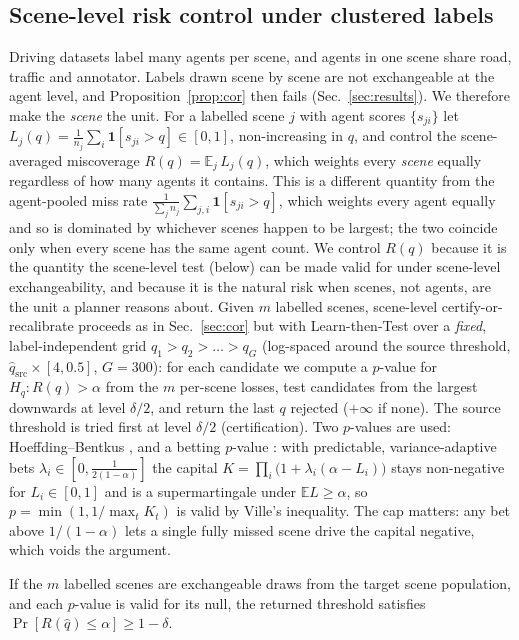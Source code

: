 \subsection{Scene-level risk control under clustered labels}\label{sec:scene}
Driving datasets label many agents per scene, and agents in one scene share road, traffic and annotator. Labels drawn scene by scene are not
exchangeable at the agent level, and Proposition~\ref{prop:cor} then fails (Sec.~\ref{sec:results}). We therefore make the \emph{scene} the unit.
For a labelled scene $j$ with agent scores $\{s_{ji}\}$ let $L_j(q)=\frac1{n_j}\sum_i\mathbf 1[s_{ji}>q]\in[0,1]$, non-increasing in $q$, and
control the scene-averaged miscoverage $R(q)=\mathbb E_j\,L_j(q)$, which weights every \emph{scene} equally regardless of
how many agents it contains. This is a different quantity from the agent-pooled miss rate $\frac1{\sum_j n_j}\sum_{j,i}\mathbf
1[s_{ji}>q]$, which weights every agent equally and so is dominated by whichever scenes happen to be largest; the two
coincide only when every scene has the same agent count. We control $R(q)$ because it is the quantity the scene-level
test (below) can be made valid for under scene-level exchangeability, and because it is the natural risk when scenes,
not agents, are the unit a planner reasons about. Given $m$ labelled scenes, scene-level certify-or-recalibrate
proceeds as in Sec.~\ref{sec:cor} but with Learn-then-Test \cite{angelopoulos2025ltt} over a \emph{fixed}, label-independent grid
$q_1>q_2>\dots>q_G$ (log-spaced around the source threshold, $\hat q_{\mathrm{src}}\times[4,0.5]$, $G=300$): for each candidate we compute a $p$-value for
$H_{q}:R(q)>\alpha$ from the $m$ per-scene losses, test candidates from the largest downwards at level $\delta/2$, and return the last $q$ rejected
($+\infty$ if none). The source threshold is tried first at level $\delta/2$ (certification). Two $p$-values are used:
Hoeffding--Bentkus \cite{bates2021rcps}, and a betting $p$-value \cite{waudbysmith2024betting}: with predictable, variance-adaptive bets
$\lambda_i\in[0,\tfrac{1}{2(1-\alpha)}]$ the capital $K=\prod_i\big(1+\lambda_i(\alpha-L_i)\big)$ stays non-negative for $L_i\in[0,1]$ and is a
supermartingale under $\mathbb E L\ge\alpha$, so $p=\min(1,1/\max_tK_t)$ is valid by Ville's inequality. The cap matters: any bet above
$1/(1-\alpha)$ lets a single fully missed scene drive the capital negative, which voids the argument.
\begin{proposition}\label{prop:scene}
If the $m$ labelled scenes are exchangeable draws from the target scene population, and each $p$-value is valid for its null, the returned
threshold satisfies $\Pr[R(\hat q)\le\alpha]\ge 1-\delta$.
\end{proposition}
